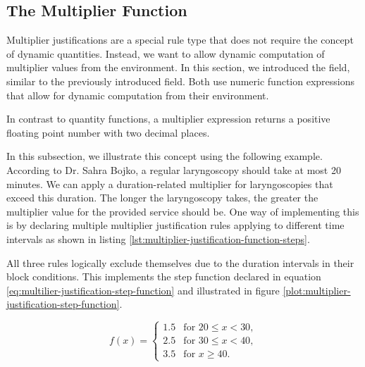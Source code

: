 \subsection{The Multiplier Function}\label{subsec:the-multiplier-function}
Multiplier justifications are a special rule type that does not require the concept of dynamic quantities.
Instead, we want to allow dynamic computation of multiplier values from the environment.
In this section, we introduced the  field, similar to the previously introduced  field.
Both use numeric function expressions that allow for dynamic computation from their environment.

In contrast to quantity functions, a multiplier expression returns a positive floating point number with two decimal places.

In this subsection, we illustrate this concept using the following example.
According to Dr. Sahra Bojko, a regular laryngoscopy should take at most 20 minutes.
We can apply a duration-related multiplier for laryngoscopies that exceed this duration.
The longer the laryngoscopy takes, the greater the multiplier value for the provided service should be.
One way of implementing this is by declaring multiple multiplier justification rules applying to different time intervals as shown in listing \ref{lst:multiplier-justification-function-steps}.

\clearpage

All three rules logically exclude themselves due to the duration intervals in their  block conditions.
This implements the step function declared in equation \ref{eq:multilier-justification-step-function} and illustrated in figure \ref{plot:multiplier-justification-step-function}.

\begin{equation}\label{eq:multilier-justification-step-function}
    f(x) =
    \begin{cases}
        1.5 & \text{for } 20 \leq x < 30, \\
        2.5 & \text{for } 30 \leq x < 40, \\
        3.5 & \text{for } x \geq 40.
    \end{cases}
\end{equation}

